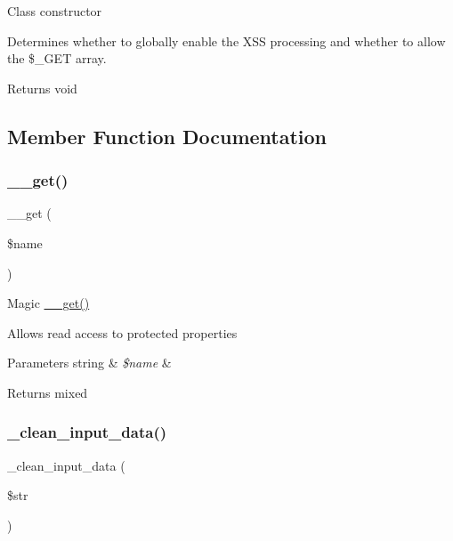 Class constructor

Determines whether to globally enable the X\+SS processing and whether to allow the \$\+\_\+\+G\+ET array.

\begin{DoxyReturn}{Returns}
void 
\end{DoxyReturn}


\subsection{Member Function Documentation}
\mbox{\label{class_c_i___input_abc8e9e31bb15c8a44c3210ec551407c8}} 
\subsubsection{\texorpdfstring{\+\_\+\+\_\+get()}{\_\_get()}}
{\footnotesize\ttfamily \+\_\+\+\_\+get (\begin{DoxyParamCaption}\item[{}]{\$name }\end{DoxyParamCaption})}

Magic \mbox{\hyperlink{class_c_i___input_abc8e9e31bb15c8a44c3210ec551407c8}{\+\_\+\+\_\+get()}}

Allows read access to protected properties


\begin{DoxyParams}[1]{Parameters}
string & {\em \$name} & \\
\hline
\end{DoxyParams}
\begin{DoxyReturn}{Returns}
mixed 
\end{DoxyReturn}
\mbox{\label{class_c_i___input_a9c594152e7b189a290f6425df8712b73}} 
\subsubsection{\texorpdfstring{\+\_\+clean\+\_\+input\+\_\+data()}{\_clean\_input\_data()}}
{\footnotesize\ttfamily \+\_\+clean\+\_\+input\+\_\+data (\begin{DoxyParamCaption}\item[{}]{\$str }\end{DoxyParamCaption})\hspace{0.3cm}{\ttfamily [protected]}}

